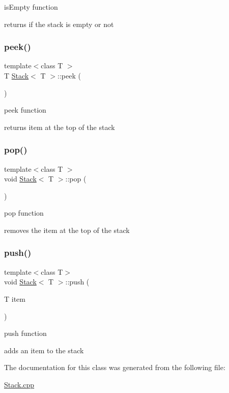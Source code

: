 is\+Empty function 

returns if the stack is empty or not \hypertarget{class_stack_adcb4774ac8aa94cbc19b461da9bdee3a}{}\label{class_stack_adcb4774ac8aa94cbc19b461da9bdee3a} 
\subsubsection{\texorpdfstring{peek()}{peek()}}
{\footnotesize\ttfamily template$<$class T $>$ \\
T \hyperlink{class_stack}{Stack}$<$ T $>$\+::peek (\begin{DoxyParamCaption}{ }\end{DoxyParamCaption})}



peek function 

returns item at the top of the stack \hypertarget{class_stack_a2723aec5c7e2611b97fcffeb7709de33}{}\label{class_stack_a2723aec5c7e2611b97fcffeb7709de33} 
\subsubsection{\texorpdfstring{pop()}{pop()}}
{\footnotesize\ttfamily template$<$class T $>$ \\
void \hyperlink{class_stack}{Stack}$<$ T $>$\+::pop (\begin{DoxyParamCaption}{ }\end{DoxyParamCaption})}



pop function 

removes the item at the top of the stack \hypertarget{class_stack_ac6a042db904e8f869ad8422658b6ca64}{}\label{class_stack_ac6a042db904e8f869ad8422658b6ca64} 
\subsubsection{\texorpdfstring{push()}{push()}}
{\footnotesize\ttfamily template$<$class T$>$ \\
void \hyperlink{class_stack}{Stack}$<$ T $>$\+::push (\begin{DoxyParamCaption}\item[{T}]{item }\end{DoxyParamCaption})}



push function 

adds an item to the stack 

The documentation for this class was generated from the following file\+:\begin{DoxyCompactItemize}
\item 
\hyperlink{_stack_8cpp}{Stack.\+cpp}\end{DoxyCompactItemize}
